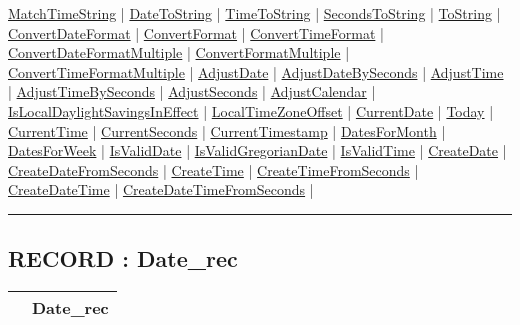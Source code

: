 \hyperlink{ecldoc:date.matchtimestring}{MatchTimeString}  |
\hyperlink{ecldoc:date.datetostring}{DateToString}  |
\hyperlink{ecldoc:date.timetostring}{TimeToString}  |
\hyperlink{ecldoc:date.secondstostring}{SecondsToString}  |
\hyperlink{ecldoc:date.tostring}{ToString}  |
\hyperlink{ecldoc:date.convertdateformat}{ConvertDateFormat}  |
\hyperlink{ecldoc:date.convertformat}{ConvertFormat}  |
\hyperlink{ecldoc:date.converttimeformat}{ConvertTimeFormat}  |
\hyperlink{ecldoc:date.convertdateformatmultiple}{ConvertDateFormatMultiple}  |
\hyperlink{ecldoc:date.convertformatmultiple}{ConvertFormatMultiple}  |
\hyperlink{ecldoc:date.converttimeformatmultiple}{ConvertTimeFormatMultiple}  |
\hyperlink{ecldoc:date.adjustdate}{AdjustDate}  |
\hyperlink{ecldoc:date.adjustdatebyseconds}{AdjustDateBySeconds}  |
\hyperlink{ecldoc:date.adjusttime}{AdjustTime}  |
\hyperlink{ecldoc:date.adjusttimebyseconds}{AdjustTimeBySeconds}  |
\hyperlink{ecldoc:date.adjustseconds}{AdjustSeconds}  |
\hyperlink{ecldoc:date.adjustcalendar}{AdjustCalendar}  |
\hyperlink{ecldoc:date.islocaldaylightsavingsineffect}{IsLocalDaylightSavingsInEffect}  |
\hyperlink{ecldoc:date.localtimezoneoffset}{LocalTimeZoneOffset}  |
\hyperlink{ecldoc:date.currentdate}{CurrentDate}  |
\hyperlink{ecldoc:date.today}{Today}  |
\hyperlink{ecldoc:date.currenttime}{CurrentTime}  |
\hyperlink{ecldoc:date.currentseconds}{CurrentSeconds}  |
\hyperlink{ecldoc:date.currenttimestamp}{CurrentTimestamp}  |
\hyperlink{ecldoc:date.datesformonth}{DatesForMonth}  |
\hyperlink{ecldoc:date.datesforweek}{DatesForWeek}  |
\hyperlink{ecldoc:date.isvaliddate}{IsValidDate}  |
\hyperlink{ecldoc:date.isvalidgregoriandate}{IsValidGregorianDate}  |
\hyperlink{ecldoc:date.isvalidtime}{IsValidTime}  |
\hyperlink{ecldoc:date.createdate}{CreateDate}  |
\hyperlink{ecldoc:date.createdatefromseconds}{CreateDateFromSeconds}  |
\hyperlink{ecldoc:date.createtime}{CreateTime}  |
\hyperlink{ecldoc:date.createtimefromseconds}{CreateTimeFromSeconds}  |
\hyperlink{ecldoc:date.createdatetime}{CreateDateTime}  |
\hyperlink{ecldoc:date.createdatetimefromseconds}{CreateDateTimeFromSeconds}  |

\rule{\textwidth}{0.4pt}

\subsection*{RECORD : Date\_rec}
\hypertarget{ecldoc:date.date_rec}{}

{\renewcommand{\arraystretch}{1.5}
\begin{tabularx}{\textwidth}{|>{\raggedright\arraybackslash}l|X|}
\hline
\hspace{0pt} & Date\_rec \\
\hline
\end{tabularx}
}

